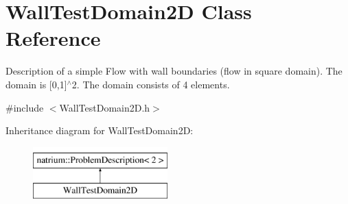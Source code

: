 \hypertarget{classWallTestDomain2D}{\section{Wall\-Test\-Domain2\-D Class Reference}
\label{classWallTestDomain2D}
}


Description of a simple Flow with wall boundaries (flow in square domain). The domain is \mbox{[}0,1\mbox{]}$^\wedge$2. The domain consists of 4 elements.  




{\ttfamily \#include $<$Wall\-Test\-Domain2\-D.\-h$>$}

Inheritance diagram for Wall\-Test\-Domain2\-D\-:\begin{figure}[H]
\begin{center}
\leavevmode
\includegraphics[height=2.000000cm]{classWallTestDomain2D}
\end{center}
\end{figure}
